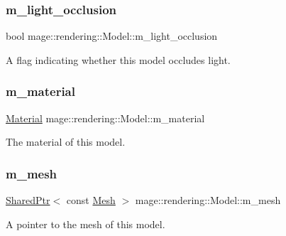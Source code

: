 \subsubsection{\texorpdfstring{m\+\_\+light\+\_\+occlusion}{m\_light\_occlusion}}
{\footnotesize\ttfamily bool mage\+::rendering\+::\+Model\+::m\+\_\+light\+\_\+occlusion\hspace{0.3cm}{\ttfamily [private]}}

A flag indicating whether this model occludes light. \hypertarget{classmage_1_1rendering_1_1_model_a933d2f661f511908e7c1e9030cfc777d}{}\label{classmage_1_1rendering_1_1_model_a933d2f661f511908e7c1e9030cfc777d} 
\subsubsection{\texorpdfstring{m\+\_\+material}{m\_material}}
{\footnotesize\ttfamily \hyperlink{classmage_1_1rendering_1_1_material}{Material} mage\+::rendering\+::\+Model\+::m\+\_\+material\hspace{0.3cm}{\ttfamily [private]}}

The material of this model. \hypertarget{classmage_1_1rendering_1_1_model_a38be646490affe6bd2f2f2bb61d04caa}{}\label{classmage_1_1rendering_1_1_model_a38be646490affe6bd2f2f2bb61d04caa} 
\subsubsection{\texorpdfstring{m\+\_\+mesh}{m\_mesh}}
{\footnotesize\ttfamily \hyperlink{namespacemage_a1e01ae66713838a7a67d30e44c67703e}{Shared\+Ptr}$<$ const \hyperlink{classmage_1_1rendering_1_1_mesh}{Mesh} $>$ mage\+::rendering\+::\+Model\+::m\+\_\+mesh\hspace{0.3cm}{\ttfamily [private]}}

A pointer to the mesh of this model. \hypertarget{classmage_1_1rendering_1_1_model_abc3536c8511523e459fd245ef3c487f2}{}\label{classmage_1_1rendering_1_1_model_abc3536c8511523e459fd245ef3c487f2} 
